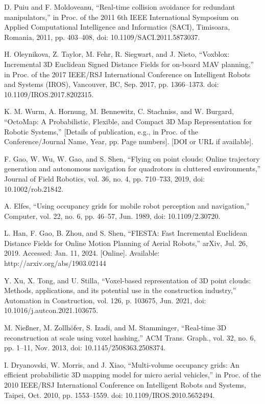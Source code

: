 \documentclass[letterpaper, 10 pt, conference]{ieeeconf}  %
\begin{document}
\begin{thebibliography}{99}
 D. Puiu and F. Moldoveanu, “Real-time collision avoidance for redundant manipulators,” in Proc. of the 2011 6th IEEE International Symposium on Applied Computational Intelligence and Informatics (SACI), Timisoara, Romania, 2011, pp. 403–408, doi: 10.1109/SACI.2011.5873037.

 H. Oleynikova, Z. Taylor, M. Fehr, R. Siegwart, and J. Nieto, “Voxblox: Incremental 3D Euclidean Signed Distance Fields for on-board MAV planning,” in Proc. of the 2017 IEEE/RSJ International Conference on Intelligent Robots and Systems (IROS), Vancouver, BC, Sep. 2017, pp. 1366–1373. doi: 10.1109/IROS.2017.8202315.

 K. M. Wurm, A. Hornung, M. Bennewitz, C. Stachniss, and W. Burgard, “OctoMap: A Probabilistic, Flexible, and Compact 3D Map Representation for Robotic Systems,” [Details of publication, e.g., in Proc. of the Conference/Journal Name, Year, pp. Page numbers]. [DOI or URL if available].

 F. Gao, W. Wu, W. Gao, and S. Shen, “Flying on point clouds: Online trajectory generation and autonomous navigation for quadrotors in cluttered environments,” Journal of Field Robotics, vol. 36, no. 4, pp. 710–733, 2019, doi: 10.1002/rob.21842.

 A. Elfes, “Using occupancy grids for mobile robot perception and navigation,” Computer, vol. 22, no. 6, pp. 46–57, Jun. 1989, doi: 10.1109/2.30720.

 L. Han, F. Gao, B. Zhou, and S. Shen, “FIESTA: Fast Incremental Euclidean Distance Fields for Online Motion Planning of Aerial Robots,” arXiv, Jul. 26, 2019. Accessed: Jan. 11, 2024. [Online]. Available: http://arxiv.org/abs/1903.02144

 Y. Xu, X. Tong, and U. Stilla, “Voxel-based representation of 3D point clouds: Methods, applications, and its potential use in the construction industry,” Automation in Construction, vol. 126, p. 103675, Jun. 2021, doi: 10.1016/j.autcon.2021.103675.

 M. Nießner, M. Zollhöfer, S. Izadi, and M. Stamminger, “Real-time 3D reconstruction at scale using voxel hashing,” ACM Trans. Graph., vol. 32, no. 6, pp. 1–11, Nov. 2013, doi: 10.1145/2508363.2508374.

 I. Dryanovski, W. Morris, and J. Xiao, “Multi-volume occupancy grids: An efficient probabilistic 3D mapping model for micro aerial vehicles,” in Proc. of the 2010 IEEE/RSJ International Conference on Intelligent Robots and Systems, Taipei, Oct. 2010, pp. 1553–1559. doi: 10.1109/IROS.2010.5652494.


\end{thebibliography}
\end{document}
